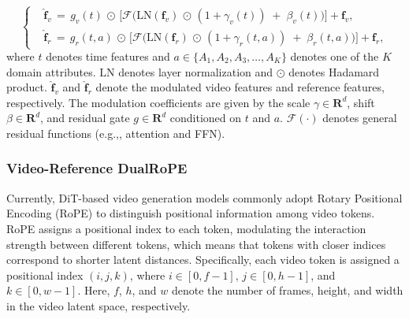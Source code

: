 \documentclass{llmxive}
\providecommand{\eg}{e.g.,\xspace}
\begin{document}
\begin{equation}
\left\{
\begin{aligned}
& \hat{\boldsymbol{f}}_v \, =  \, g_{v}(t) \,\odot\, \big[ \mathcal{F}\big( \mathrm{LN}( \boldsymbol{f}_v) \,\odot\, (1+\gamma_{v}(t))  \;+\; \beta_{v}(t) \big)\big] + \boldsymbol{f}_v , \\
& \hat{\boldsymbol{f}}_r \, = \, g_{r}(t,a) \,\odot\, \big[ \mathcal{F} \big( \mathrm{LN}( \boldsymbol{f}_r) \,\odot\,  (1+\gamma_{r}(t,a))  \;+\; \beta_{r}(t,a)\big) \big] +\boldsymbol{f}_r  ,
\end{aligned}
\right.
\end{equation}
where $t$ denotes time features and $a \in  \{A_1, A_2, A_3, \ldots, A_K\}$ denotes one of the $K$ domain attributes. $\mathrm{LN}$ denotes layer normalization and  $\odot$ denotes Hadamard product.  $\hat{\boldsymbol{f}}_v$ and $\hat{\boldsymbol{f}}_r$ denote the modulated video features and reference features, respectively. The modulation coefficients are given by the scale $\gamma \in \mathbf{R}^{d}$, shift $\beta \in\mathbf{R}^{d}$, and residual gate $g \in \mathbf{R}^{d}$ conditioned on $t$ and $a$. $\mathcal{F}(\cdot)$ denotes general residual functions (\eg, attention and FFN).




\subsubsection{ Video-Reference DualRoPE}
\label{3.2.2}

Currently, DiT-based video generation models \cite{wan2025wan,yang2024cogvideox} commonly adopt Rotary Positional Encoding (RoPE) to distinguish positional information among video tokens. RoPE assigns a positional index to each token, modulating the interaction strength between different tokens, which means that tokens with closer indices correspond to shorter latent distances. Specifically, each video token is assigned a positional index $(i,j,k)$, where $i\in[0,f-1]$, $j\in[0,h-1]$, and $k\in[0,w-1]$. Here, $f$, $h$, and $w$ denote the number of frames, height, and width in the video latent space, respectively.
\end{document}
